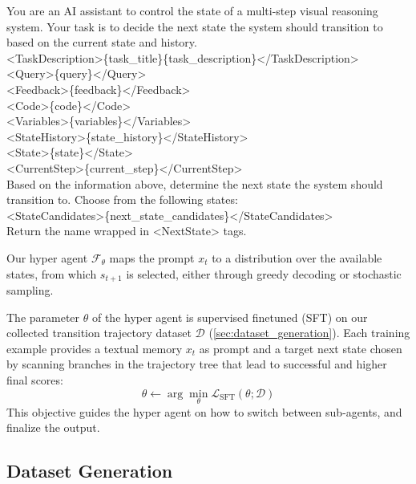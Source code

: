 \documentclass{article} %
\begin{document}
\begin{prompt}[title={Prompt \thetcbcounter: LLM State Controller in Hyper Agent}] \label{prompt:hyper_agent}
You are an AI assistant to control the state of a multi-step visual reasoning system. Your task is to decide the next state the system should transition to based on the current state and history. \\
<TaskDescription>\{task\_title\}\{task\_description\}</TaskDescription>\\
<Query>\{query\}</Query>\\
<Feedback>\{feedback\}</Feedback>\\
<Code>\{code\}</Code>\\
<Variables>\{variables\}</Variables>\\
<StateHistory>\{state\_history\}</StateHistory>\\
<State>\{state\}</State>\\
<CurrentStep>\{current\_step\}</CurrentStep>\\
Based on the information above, determine the next state the system should transition to. Choose from the following states:\\
<StateCandidates>\{next\_state\_candidates\}</StateCandidates>\\
Return the name wrapped in <NextState> tags.
\end{prompt}

Our hyper agent $\mathcal{F}_\theta$ maps the prompt $x_t$ to a distribution over the available states, from which $s_{t+1}$ is selected, either through greedy decoding or stochastic sampling.

The parameter $\theta$ of the hyper agent is supervised finetuned (SFT) on our collected transition trajectory dataset $\mathcal{D}$ (\autoref{sec:dataset_generation}). Each training example provides a textual memory $x_t$ as prompt and a target next state chosen by scanning branches in the trajectory tree that lead to successful and higher final scores:
\begin{equation}
\theta \leftarrow \arg\min_\theta\mathcal{L}_{\mathrm{SFT}}(\theta;\mathcal{D})
\end{equation}
This objective guides the hyper agent on how to switch between sub-agents, and finalize the output.

\subsection{Dataset Generation}
\label{sec:dataset_generation}
\end{document}
